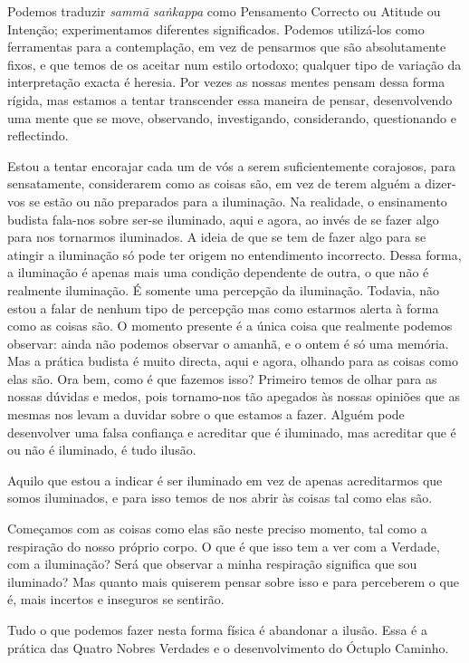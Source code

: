 Podemos traduzir \emph{sammā saṅkappa} como Pensamento Correcto ou Atitude ou
Intenção; experimentamos diferentes significados. Podemos utilizá-los como
ferramentas para a contemplação, em vez de pensarmos que são absolutamente
fixos, e que temos de os aceitar num estilo ortodoxo; qualquer tipo de variação
da interpretação exacta é heresia. Por vezes as nossas mentes pensam dessa forma
rígida, mas estamos a tentar transcender essa maneira de pensar, desenvolvendo
uma mente que se move, observando, investigando, considerando, questionando e
reflectindo.

Estou a tentar encorajar cada um de vós a serem suficientemente corajosos, para
sensatamente, considerarem como as coisas são, em vez de terem alguém a
dizer-vos se estão ou não preparados para a iluminação. Na realidade, o
ensinamento budista fala-nos sobre ser-se iluminado, aqui e agora, ao invés de
se fazer algo para nos tornarmos iluminados. A ideia de que se tem de fazer algo
para se atingir a iluminação só pode ter origem no entendimento incorrecto.
Dessa forma, a iluminação é apenas mais uma condição dependente de outra, o que
não é realmente iluminação. É somente uma percepção da iluminação. Todavia, não
estou a falar de nenhum tipo de percepção mas como estarmos alerta à forma como
as coisas são. O momento presente é a única coisa que realmente podemos
observar: ainda não podemos observar o amanhã, e o ontem é só uma memória. Mas a
prática budista é muito directa, aqui e agora, olhando para as coisas como elas
são. Ora bem, como é que fazemos isso? Primeiro temos de olhar para as nossas
dúvidas e medos, pois tornamo-nos tão apegados às nossas opiniões que as mesmas
nos levam a duvidar sobre o que estamos a fazer. Alguém pode desenvolver uma
falsa confiança e acreditar que é iluminado, mas acreditar que é ou não é
iluminado, é tudo ilusão.

Aquilo que estou a indicar é ser iluminado em vez de apenas acreditarmos que
somos iluminados, e para isso temos de nos abrir às coisas tal como elas são.

Começamos com as coisas como elas são neste preciso momento, tal como a
respiração do nosso próprio corpo. O que é que isso tem a ver com a Verdade, com
a iluminação? Será que observar a minha respiração significa que sou iluminado?
Mas quanto mais quiserem pensar sobre isso e para perceberem o que é, mais
incertos e inseguros se sentirão.

Tudo o que podemos fazer nesta forma física é abandonar a ilusão. Essa é a
prática das Quatro Nobres Verdades e o desenvolvimento do Óctuplo Caminho.


